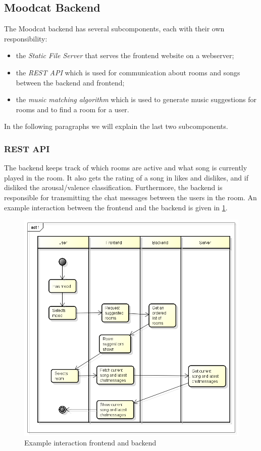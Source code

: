 \subsection{Moodcat Backend}
The Moodcat backend has several subcomponents, each with their own responsibility:
\begin{itemize}
\item the \textit{Static File Server} that serves the frontend website on a webserver;
\item the \textit{REST API} which is used for communication about rooms and songs between the backend and frontend;
\item the \textit{music matching algorithm} which is used to generate music suggestions for rooms and to find a room for a user.
\end{itemize}
In the following paragraphs we will explain the last two subcomponents.

\subsubsection{REST API}
The backend keeps track of which rooms are active and what song is currently played in the room.
It also gets the rating of a song in likes and dislikes, and if disliked the arousal/valence classification.
Furthermore, the backend is responsible for transmitting the chat messages between the users in the room.
An example interaction between the frontend and the backend is given in \ref{fig: backendInteraction}.

\begin{figure}[H]
\includegraphics[scale=.4]{backendInteraction.png}
\caption{Example interaction frontend and backend}
\label{fig: backendInteraction}
\end{figure}


